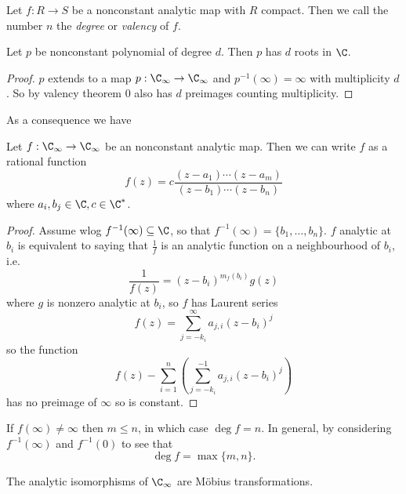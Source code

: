 \documentclass[a4paper]{article}
\begin{document}
\begin{definition}
  Let \(f: R \to S\) be a nonconstant analytic map with \(R\) compact. Then we call the number \(n\) the \emph{degree} or \emph{valency} of \(f\).
\end{definition}

\begin{corollary}
  Let \(p\) be nonconstant polynomial of degree \(d\). Then \(p\) has \(d\) roots in \(\C\).
\end{corollary}

\begin{proof}
  \(p\) extends to a map \(p: \C_\infty \to \C_\infty\) and \(p^{-1}(\infty) = \infty\) with multiplicity \(d\). So by valency theorem \(0\) also has \(d\) preimages counting multiplicity.
\end{proof}

As a consequence we have

\begin{proposition}
  Let \(f: \C_\infty \to \C_\infty\) be an nonconstant analytic map. Then we can write \(f\) as a rational function
  \[
    f(z) = c \frac{(z - a_1) \cdots (z - a_m)}{(z - b_1) \cdots (z - b_n)}
  \]
  where \(a_i, b_j \in \C, c \in \C^*\).
\end{proposition}

\begin{proof}
  Assume wlog \(f^{-1}(\infty) \subseteq \C\), so that \(f^{-1}(\infty) = \{b_1, \dots, b_n\}\). \(f\) analytic at \(b_i\) is equivalent to saying that \(\frac{1}{f}\) is an analytic function on a neighbourhood of \(b_i\), i.e.
  \[
    \frac{1}{f(z)} = (z - b_i)^{m_f(b_i)} g(z)
  \]
  where \(g\) is nonzero analytic at \(b_i\), so \(f\) has Laurent series
  \[
    f(z) = \sum_{j = -k_i}^\infty a_{j, i} (z - b_i)^j
  \]
  so the function
  \[
    f(z) - \sum_{i = 1}^n \left(\sum_{j = -k_i}^{-1} a_{j, i} (z - b_i)^j \right)
  \]
  has no preimage of \(\infty\) so is constant.
\end{proof}

\begin{remark}
  If \(f(\infty) \neq \infty\) then \(m \leq n\), in which case \(\deg f = n\). In general, by considering \(f^{-1}(\infty)\) and \(f^{-1}(0)\) to see that
  \[
    \deg f = \max \{m, n\}.
  \]
\end{remark}

\begin{corollary}
  The analytic isomorphisms of \(\C_\infty\) are Möbius transformations.
\end{corollary}
\end{document}
